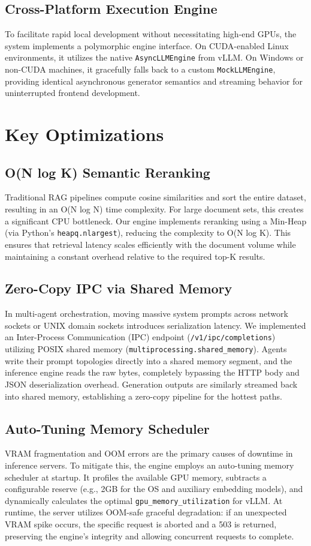 \documentclass[10pt,twocolumn,letterpaper]{article}
\begin{document}
\subsection{Cross-Platform Execution Engine}
To facilitate rapid local development without necessitating high-end GPUs, the system implements a polymorphic engine interface. On CUDA-enabled Linux environments, it utilizes the native \texttt{AsyncLLMEngine} from vLLM. On Windows or non-CUDA machines, it gracefully falls back to a custom \texttt{MockLLMEngine}, providing identical asynchronous generator semantics and streaming behavior for uninterrupted frontend development.

\section{Key Optimizations}

\subsection{O(N log K) Semantic Reranking}
Traditional RAG pipelines compute cosine similarities and sort the entire dataset, resulting in an O(N log N) time complexity. For large document sets, this creates a significant CPU bottleneck. Our engine implements reranking using a Min-Heap (via Python's \texttt{heapq.nlargest}), reducing the complexity to O(N log K). This ensures that retrieval latency scales efficiently with the document volume while maintaining a constant overhead relative to the required top-K results.

\subsection{Zero-Copy IPC via Shared Memory}
In multi-agent orchestration, moving massive system prompts across network sockets or UNIX domain sockets introduces serialization latency. We implemented an Inter-Process Communication (IPC) endpoint (\texttt{/v1/ipc/completions}) utilizing POSIX shared memory (\texttt{multiprocessing.shared\_memory}). 
Agents write their prompt topologies directly into a shared memory segment, and the inference engine reads the raw bytes, completely bypassing the HTTP body and JSON deserialization overhead. Generation outputs are similarly streamed back into shared memory, establishing a zero-copy pipeline for the hottest paths.

\subsection{Auto-Tuning Memory Scheduler}
VRAM fragmentation and OOM errors are the primary causes of downtime in inference servers. To mitigate this, the engine employs an auto-tuning memory scheduler at startup. It profiles the available GPU memory, subtracts a configurable reserve (e.g., 2GB for the OS and auxiliary embedding models), and dynamically calculates the optimal \texttt{gpu\_memory\_utilization} for vLLM. At runtime, the server utilizes OOM-safe graceful degradation: if an unexpected VRAM spike occurs, the specific request is aborted and a 503 is returned, preserving the engine's integrity and allowing concurrent requests to complete.
\end{document}

